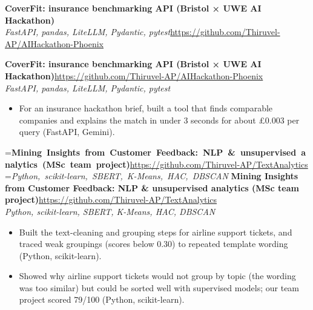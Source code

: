 \documentclass[a4paper,11pt]{article}
\newcommand{\project}[3]{%
  \textbf{#1}\hfill#3\\ {\color{muted}\small\textit{#2}}\par}
\newcommand{\gap}{\vspace{5pt}}
\begin{document}
\else
\textbf{CoverFit: insurance benchmarking API (Bristol × UWE AI Hackathon)}\\ {\color{muted}\small\textit{FastAPI, pandas, LiteLLM, Pydantic, pytest}}\hfill{\small\url{https://github.com/Thiruvel-AP/AIHackathon-Phoenix}}\par
\fi
\else
\project{CoverFit: insurance benchmarking API (Bristol × UWE AI Hackathon)}{FastAPI, pandas, LiteLLM, Pydantic, pytest}{\url{https://github.com/Thiruvel-AP/AIHackathon-Phoenix}}
\fi
\begin{itemize}
  \item For an insurance hackathon brief, built a tool that finds comparable companies and explains the match in under 3 seconds for about £0.003 per query (FastAPI, Gemini).
\end{itemize}
\gap
{}
=\hbox{\textbf{Mining Insights from Customer Feedback: NLP \& unsupervised analytics (MSc team project)}\hspace{1em}\url{https://github.com/Thiruvel-AP/TextAnalytics}}%
=\hbox{{\small\textit{Python, scikit-learn, SBERT, K-Means, HAC, DBSCAN}}}%
\ifdim\wd0>\linewidth
\ifdim\wd2>\linewidth
\textbf{Mining Insights from Customer Feedback: NLP \& unsupervised analytics (MSc team project)}\\ {\color{muted}\small\textit{Python, scikit-learn, SBERT, K-Means, HAC, DBSCAN}}\\ \hspace*{\fill}{\small\url{https://github.com/Thiruvel-AP/TextAnalytics}}\par
\else
\textbf{Mining Insights from Customer Feedback: NLP \& unsupervised analytics (MSc team project)}\\ {\color{muted}\small\textit{Python, scikit-learn, SBERT, K-Means, HAC, DBSCAN}}\hfill{\small\url{https://github.com/Thiruvel-AP/TextAnalytics}}\par
\fi
\else
\project{Mining Insights from Customer Feedback: NLP \& unsupervised analytics (MSc team project)}{Python, scikit-learn, SBERT, K-Means, HAC, DBSCAN}{\url{https://github.com/Thiruvel-AP/TextAnalytics}}
\fi
\begin{itemize}
  \item Built the text-cleaning and grouping steps for airline support tickets, and traced weak groupings (scores below 0.30) to repeated template wording (Python, scikit-learn).
  \item Showed why airline support tickets would not group by topic (the wording was too similar) but could be sorted well with supervised models; our team project scored 79/100 (Python, scikit-learn).
\end{itemize}
\end{document}
